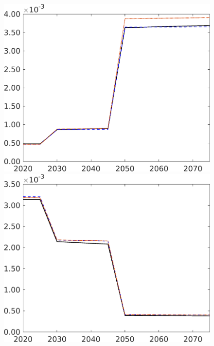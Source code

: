 \begin{figure}[h!!]
\begin{minipage}[]{0.32\textwidth}
	\includegraphics[width=1\textwidth]{../../codding_model/own_basedOnFried/optimalPol_elastS_DisuSci/figures/all_1705/Lg_CompEffOPT_T_NoTaus_spillover0_sep1_BN0_ineq0_etaa0.79_lgd0.png}
\end{minipage}
\begin{minipage}[]{0.32\textwidth}
	\includegraphics[width=1\textwidth]{../../codding_model/own_basedOnFried/optimalPol_elastS_DisuSci/figures/all_1705/Lf_CompEffOPT_T_NoTaus_spillover0_sep1_BN0_ineq0_etaa0.79_lgd0.png}

\end{minipage}
\end{figure}
